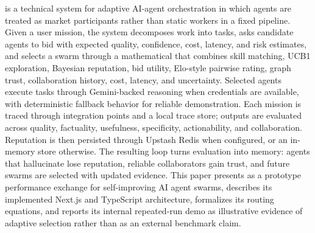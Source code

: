 \systemname{} is a technical system for adaptive AI-agent orchestration in which agents are treated as market participants rather than static workers in a fixed pipeline. Given a user mission, the system decomposes work into tasks, asks candidate agents to bid with expected quality, confidence, cost, latency, and risk estimates, and selects a swarm through a mathematical \marketmaker{} that combines skill matching, UCB1 exploration, Bayesian reputation, bid utility, Elo-style pairwise rating, graph trust, collaboration history, cost, latency, and uncertainty. Selected agents execute tasks through Gemini-backed reasoning when credentials are available, with deterministic fallback behavior for reliable demonstration. Each mission is traced through \weave{} integration points and a local trace store; outputs are evaluated across quality, factuality, usefulness, specificity, actionability, and collaboration. Reputation is then persisted through Upstash Redis when configured, or an in-memory store otherwise. The resulting loop turns evaluation into memory: agents that hallucinate lose reputation, reliable collaborators gain trust, and future swarms are selected with updated evidence. This paper presents \systemname{} as a prototype performance exchange for self-improving AI agent swarms, describes its implemented Next.js and TypeScript architecture, formalizes its routing equations, and reports its internal repeated-run demo as illustrative evidence of adaptive selection rather than as an external benchmark claim.
